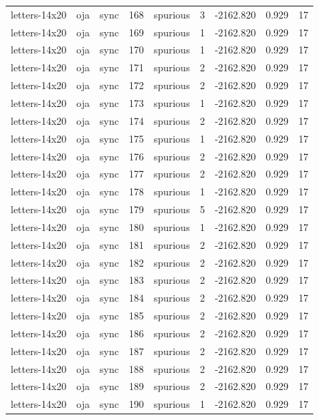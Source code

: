 \begin{tabular}{lllrlrrrr}
letters-14x20 & oja & sync & 168 & spurious & 3 & -2162.820 & 0.929 & 17 \\
letters-14x20 & oja & sync & 169 & spurious & 1 & -2162.820 & 0.929 & 17 \\
letters-14x20 & oja & sync & 170 & spurious & 1 & -2162.820 & 0.929 & 17 \\
letters-14x20 & oja & sync & 171 & spurious & 2 & -2162.820 & 0.929 & 17 \\
letters-14x20 & oja & sync & 172 & spurious & 2 & -2162.820 & 0.929 & 17 \\
letters-14x20 & oja & sync & 173 & spurious & 1 & -2162.820 & 0.929 & 17 \\
letters-14x20 & oja & sync & 174 & spurious & 2 & -2162.820 & 0.929 & 17 \\
letters-14x20 & oja & sync & 175 & spurious & 1 & -2162.820 & 0.929 & 17 \\
letters-14x20 & oja & sync & 176 & spurious & 2 & -2162.820 & 0.929 & 17 \\
letters-14x20 & oja & sync & 177 & spurious & 2 & -2162.820 & 0.929 & 17 \\
letters-14x20 & oja & sync & 178 & spurious & 1 & -2162.820 & 0.929 & 17 \\
letters-14x20 & oja & sync & 179 & spurious & 5 & -2162.820 & 0.929 & 17 \\
letters-14x20 & oja & sync & 180 & spurious & 1 & -2162.820 & 0.929 & 17 \\
letters-14x20 & oja & sync & 181 & spurious & 2 & -2162.820 & 0.929 & 17 \\
letters-14x20 & oja & sync & 182 & spurious & 2 & -2162.820 & 0.929 & 17 \\
letters-14x20 & oja & sync & 183 & spurious & 2 & -2162.820 & 0.929 & 17 \\
letters-14x20 & oja & sync & 184 & spurious & 2 & -2162.820 & 0.929 & 17 \\
letters-14x20 & oja & sync & 185 & spurious & 2 & -2162.820 & 0.929 & 17 \\
letters-14x20 & oja & sync & 186 & spurious & 2 & -2162.820 & 0.929 & 17 \\
letters-14x20 & oja & sync & 187 & spurious & 2 & -2162.820 & 0.929 & 17 \\
letters-14x20 & oja & sync & 188 & spurious & 2 & -2162.820 & 0.929 & 17 \\
letters-14x20 & oja & sync & 189 & spurious & 2 & -2162.820 & 0.929 & 17 \\
letters-14x20 & oja & sync & 190 & spurious & 1 & -2162.820 & 0.929 & 17 \\

\end{tabular}
